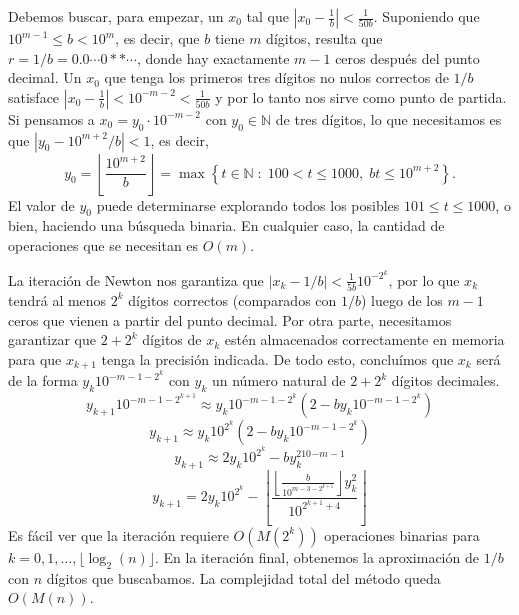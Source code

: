 \documentclass[a4paper, 11pt]{article}
\newcommand{\NN}{\mathbb{N}}
\theoremstyle{plain}
\theoremstyle{definition}
\begin{document}
\bigskip

Debemos buscar, para empezar, un $x_0$ tal que
$\left|x_0-\frac1b\right|<\frac1{50b}$. Suponiendo que $10^{m-1}\leq b<10^m$,
es decir, que $b$ tiene $m$ dígitos, resulta que $r=1/b=0.0\cdots0\ast\ast\cdots$,
donde hay exactamente $m-1$ ceros después del punto decimal. Un $x_0$ que tenga
los primeros tres dígitos no nulos correctos de $1/b$ satisface
$\left|x_0-\frac1b\right|<10^{-m-2}<\frac1{50b}$ y por lo tanto nos sirve
como punto de partida. Si pensamos a $x_0=y_0\cdot 10^{-m-2}$ con $y_0\in\NN$
de tres dígitos, lo que necesitamos es que $|y_0-10^{m+2}/b|<1$, es decir,
\[
  y_0=\left\lfloor\frac{10^{m+2}}b\right\rfloor=\max\left\{t\in\NN\;:\;100<
  t\leq 1000,\;bt\leq 10^{m+2}\right\}.
\]
El valor de $y_0$ puede determinarse explorando todos los posibles $101\leq t\leq
1000$, o bien, haciendo una búsqueda binaria. En cualquier caso, la cantidad de
operaciones que se necesitan es $O(m)$.

\bigskip

La iteración de Newton nos garantiza que $|x_k-1/b|<\frac1{5b}10^{-2^k}$, por
lo que $x_k$ tendrá al menos $2^k$ dígitos correctos (comparados con $1/b$)
luego de los $m-1$ ceros que vienen a partir del punto decimal. Por otra parte,
necesitamos garantizar que $2+2^k$ dígitos de $x_k$ estén almacenados correctamente
en memoria para que $x_{k+1}$ tenga la precisión indicada. De todo esto,
concluímos que $x_k$ será de la forma $y_k10^{-m-1-2^k}$ con $y_k$ un número
natural de $2+2^k$ dígitos decimales.
\[
   y_{k+1}10^{-m-1-2^{k+1}}\approx y_k10^{-m-1-2^k}(2-by_k10^{-m-1-2^k})
\]
\[
   y_{k+1}\approx y_k10^{2^k}(2-by_k10^{-m-1-2^k})
\]
\[
  y_{k+1}\approx 2y_k10^{2^k}-by_k^210^{-m-1}
\]
\[
  y_{k+1}=2y_k10^{2^k}-\left\lfloor\frac{\left\lfloor\frac{b}{10^{m-3-2^{k+1}}}
  \right\rfloor y_k^2}{10^{2^{k+1}+4}}\right\rfloor
\]
Es fácil ver que la iteración requiere $O(M(2^k))$ operaciones binarias para
$k=0,1,\ldots,\lfloor\log_2(n)\rfloor$. En la iteración final, obtenemos la
aproximación de $1/b$ con $n$ dígitos que buscabamos. La complejidad total
del método queda $O(M(n))$.

\bigskip
\end{document}
